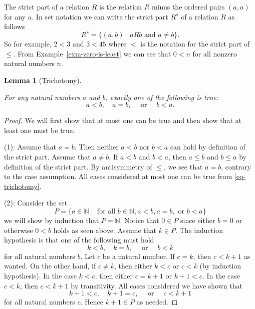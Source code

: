 \documentclass[
  twoside,
  12pt,
  letterpaper]{article}
\theoremstyle{definition}
\theoremstyle{definition}
\theoremstyle{definition}
\theoremstyle{plain}
\newtheorem{lemma}{Lemma}[section]
\theoremstyle{plain}
\theoremstyle{remark}
\begin{document}
The strict part of a relation \(R\) is the relation \(R\) minus the
ordered pairs \((a,a)\) for any \(a.\) In set notation we can write the
strict part \(R^s\) of a relation \(R\) as follows \[
R^s = \{(a,b) \mid aRb \text{ and } a\neq b \}.
\] So for example, \(2<3\) and \(3<45\) where \(<\) is the notation for
the strict part of \(\leq.\) From Example~\ref{exm-zero-is-least} we can
see that \(0<n\) for all nonzero natural numbers \(n\).

\begin{lemma}[Trichotomy]\protect\hypertarget{lem-trichotomy}{}\label{lem-trichotomy}

For any natural numbers \(a\) and \(b\), exactly one of the following is
true: \begin{equation}
\label{eq-trichotomy}
a < b, \quad a = b, \quad \text{ or } \quad b < a.
\end{equation}

\end{lemma}

\begin{proof}

We will first show that at most one can be true and then show that at
least one must be true.

(1): Assume that \(a=b\). Then neither \(a<b\) nor \(b<a\) can hold by
definition of the strict part. Assume that \(a\neq b\). If \(a<b\) and
\(b<a\), then \(a\leq b\) and \(b\leq a\) by definition of the strict
part. By antisymmetry of \(\leq\), we see that \(a=b\), contrary to the
case assumption. All cases considered at most one can be true from
\eqref{eq-trichotomy}.

(2): Consider the set \[
P =\{ a\in \mathbb{N} \mid \text{ for all } b\in \mathbb{N}, a < b, a=b, \text{ or } b < a \}
\] we will show by induction that \(P=\mathbb{N}\). Notice that
\(0\in P\) since either \(b=0\) or otherwise \(0<b\) holds as seen
above. Assume that \(k\in P\). The induction hypothesis is that one of
the following must hold \begin{equation}
\label{eq-trichotomy-hypothesis}
k < b, \quad k = b, \quad \text{ or } \quad b < k
\end{equation} for all natural numbers \(b\). Let \(c\) be a natural
number. If \(c=k\), then \(c < k+1\) as wanted. On the other hand, if
\(c\neq k\), then either \(k<c\) or \(c<k\) (by induction hypothesis).
In the case \(k < c\), then either \(c=k+1\) or \(k+1 < c.\) In the case
\(c < k\), then \(c < k+1\) by transitivity. All cases considered we
have shown that \begin{equation}
\label{eq-trichotomy-hypothesis-two}
k+1 < c, \quad k+1 = c, \quad \text{ or } \quad c < k+1
\end{equation} for all natural numbers \(c\). Hence \(k+1\in P\) as
needed.

\end{proof}
\end{document}
